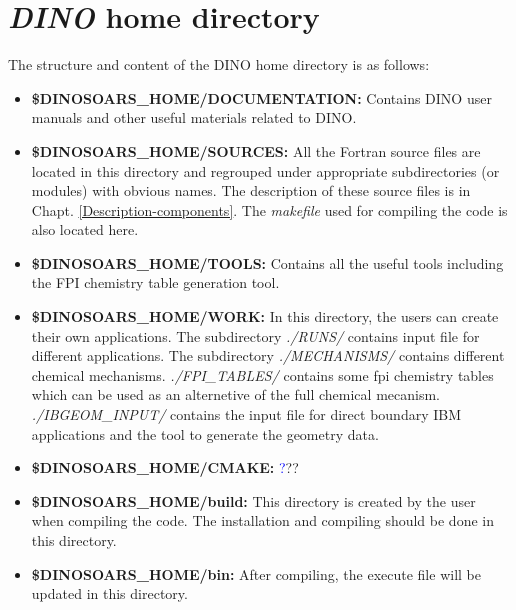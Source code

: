 \section{{\it DINO} home directory}
\label{DINO-home-directory}
The structure and content of the DINO home directory is as follows:
\begin{itemize}
\item \textbf{\$DINOSOARS\_HOME/DOCUMENTATION:} Contains DINO user manuals and other useful materials related to DINO.
\item \textbf{\$DINOSOARS\_HOME/SOURCES:} All the Fortran source files are located in this directory and regrouped under appropriate subdirectories (or modules) with obvious names. The description of these source files is in Chapt. \ref{Description-components}. The \textit{makefile} used for compiling the code is also located here.
\item \textbf{\$DINOSOARS\_HOME/TOOLS:} Contains all the useful tools including the FPI chemistry table generation tool.
\item \textbf{\$DINOSOARS\_HOME/WORK:} In this directory, the users can create their own applications. The subdirectory \textit{./RUNS/} contains input file for different applications. The subdirectory \textit{./MECHANISMS/} contains different chemical mechanisms. \textit{./FPI\_TABLES/} contains some fpi chemistry tables which can be used as an alternetive of the full chemical mecanism. \textit{./IBGEOM\_INPUT/} contains the input file for direct boundary IBM applications and the tool to generate the geometry data.
\item \textbf{\$DINOSOARS\_HOME/CMAKE:} {\textcolor{blue} ???}
\item \textbf{\$DINOSOARS\_HOME/build:} This directory is created by the user when compiling the code. The installation and compiling should be done in this directory.
\item \textbf{\$DINOSOARS\_HOME/bin:} After compiling, the execute file will be updated in this directory.
\end{itemize}
